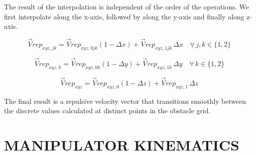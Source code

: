 \documentclass[letterpaper, 10 pt, conference]{ieeeconf}  %
\begin{document}
The result of the interpolation is independent of the order of the operations. We first interpolate along the x-axis, followed by along the y-axis and finally along z-axis.

	
\begin{equation}
	\label{eq: interp x}
	\vec{V}rep_{xyz,jk} = \vec{V}rep_{xyz,0jk}(1 - \Delta x) + \vec{V}rep_{xyz,1jk} \, \Delta x \quad \forall \, j, k \in \{1, 2\}
\end{equation}

%

\begin{equation}
	\label{eq: interp y}
	\vec{V}rep_{xyz,k} = \vec{V}rep_{xyz,0k}(1 - \Delta y) + \vec{V}rep_{xyz,1k} \, \Delta y \quad \forall \, k \in \{1, 2\}
\end{equation}

\begin{equation}
	\label{eq: interp z}
	\vec{V}rep_{xyz} = \vec{V}rep_{xyz,0}(1 - \Delta z) + \vec{V}rep_{xyz,1} \, \Delta z 
\end{equation}

The final result is a repulsive velocity vector that transitions smoothly between the discrete values calculated at distinct points in the obstacle grid.

\section{MANIPULATOR KINEMATICS}
\end{document}

